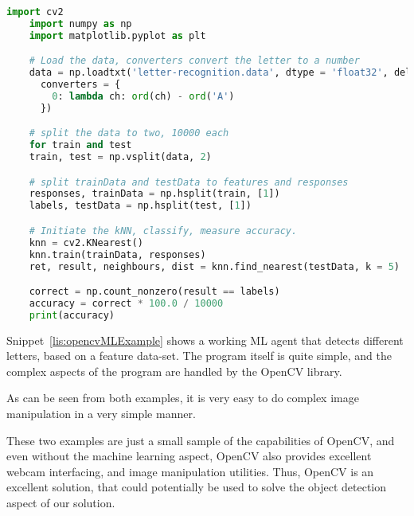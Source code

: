 \begin{lstlisting}[language=Python,label=lis:opencvMLExample,caption=Source code OpenCV documentation\cite{opencvMLexamples}.]
	import cv2
	import numpy as np
	import matplotlib.pyplot as plt

	# Load the data, converters convert the letter to a number
	data = np.loadtxt('letter-recognition.data', dtype = 'float32', delimiter = ',',
	  converters = {
	    0: lambda ch: ord(ch) - ord('A')
	  })

	# split the data to two, 10000 each
	for train and test
	train, test = np.vsplit(data, 2)

	# split trainData and testData to features and responses
	responses, trainData = np.hsplit(train, [1])
	labels, testData = np.hsplit(test, [1])

	# Initiate the kNN, classify, measure accuracy.
	knn = cv2.KNearest()
	knn.train(trainData, responses)
	ret, result, neighbours, dist = knn.find_nearest(testData, k = 5)

	correct = np.count_nonzero(result == labels)
	accuracy = correct * 100.0 / 10000
	print(accuracy)
\end{lstlisting}

Snippet~\ref{lis:opencvMLExample} shows a working ML agent that detects different letters, based on a feature data-set.
The program itself is quite simple, and the complex aspects of the program are handled by the OpenCV library.

As can be seen from both examples, it is very easy to do complex image manipulation in a very simple manner.

These two examples are just a small sample of the capabilities of OpenCV, and even without the machine learning aspect, OpenCV also provides excellent webcam interfacing, and image manipulation utilities.
Thus, OpenCV is an excellent solution, that could potentially be used to solve the object detection aspect of our solution.



